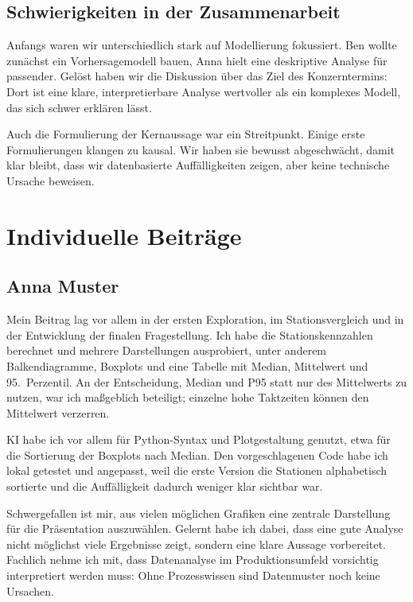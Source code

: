 \documentclass[a4paper, 11pt]{article}
\begin{document}
\subsection{Schwierigkeiten in der Zusammenarbeit}

Anfangs waren wir unterschiedlich stark auf Modellierung fokussiert. Ben wollte zunächst ein Vorhersagemodell bauen, Anna hielt eine deskriptive Analyse für passender. Gelöst haben wir die Diskussion über das Ziel des Konzerntermins: Dort ist eine klare, interpretierbare Analyse wertvoller als ein komplexes Modell, das sich schwer erklären lässt.

Auch die Formulierung der Kernaussage war ein Streitpunkt. Einige erste Formulierungen klangen zu kausal. Wir haben sie bewusst abgeschwächt, damit klar bleibt, dass wir datenbasierte Auffälligkeiten zeigen, aber keine technische Ursache beweisen.

\section{Individuelle Beiträge}

\subsection*{Anna Muster}

Mein Beitrag lag vor allem in der ersten Exploration, im Stationsvergleich und in der Entwicklung der finalen Fragestellung. Ich habe die Stationskennzahlen berechnet und mehrere Darstellungen ausprobiert, unter anderem Balkendiagramme, Boxplots und eine Tabelle mit Median, Mittelwert und 95.\ Perzentil. An der Entscheidung, Median und P95 statt nur des Mittelwerts zu nutzen, war ich maßgeblich beteiligt; einzelne hohe Taktzeiten können den Mittelwert verzerren.

KI habe ich vor allem für Python-Syntax und Plotgestaltung genutzt, etwa für die Sortierung der Boxplots nach Median. Den vorgeschlagenen Code habe ich lokal getestet und angepasst, weil die erste Version die Stationen alphabetisch sortierte und die Auffälligkeit dadurch weniger klar sichtbar war.

Schwergefallen ist mir, aus vielen möglichen Grafiken eine zentrale Darstellung für die Präsentation auszuwählen. Gelernt habe ich dabei, dass eine gute Analyse nicht möglichst viele Ergebnisse zeigt, sondern eine klare Aussage vorbereitet. Fachlich nehme ich mit, dass Datenanalyse im Produktionsumfeld vorsichtig interpretiert werden muss: Ohne Prozesswissen sind Datenmuster noch keine Ursachen.
\end{document}
